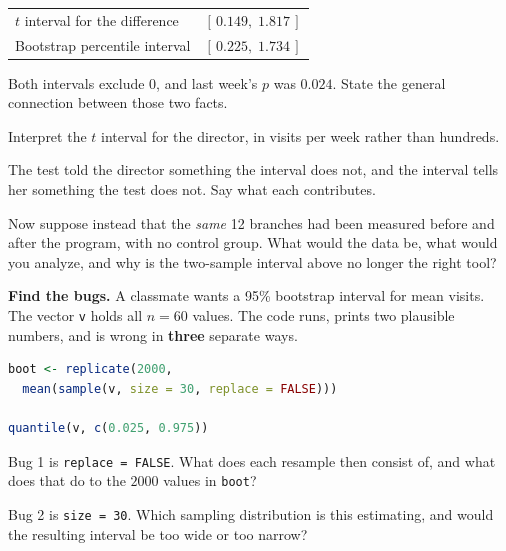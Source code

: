 \documentclass[11pt]{article}
\newcommand{\answerspace}[1]{\vspace{#1}}
\begin{document}
\begin{questions}
\begin{center}
\renewcommand{\arraystretch}{1.2}
\begin{tabular}{ll}
\toprule
$t$ interval for the difference & $[\,0.149,\; 1.817\,]$ \\
Bootstrap percentile interval & $[\,0.225,\; 1.734\,]$ \\
\bottomrule
\end{tabular}
\end{center}

\begin{parts}
\item Both intervals exclude $0$, and last week's $p$ was $0.024$. State the general connection
between those two facts.
\answerspace{3.5em}

\item Interpret the $t$ interval for the director, in visits per week rather than hundreds.
\answerspace{4em}

\item The test told the director something the interval does not, and the interval tells her
something the test does not. Say what each contributes.
\answerspace{4em}

\item Now suppose instead that the \emph{same} 12 branches had been measured before and after the
program, with no control group. What would the data be, what would you analyze, and why is the
two-sample interval above no longer the right tool?
\answerspace{4.5em}
\end{parts}

\item \textbf{Find the bugs.} A classmate wants a 95\% bootstrap interval for mean visits. The
vector \texttt{v} holds all $n = 60$ values. The code runs, prints two plausible numbers, and is
wrong in \textbf{three} separate ways.

\begin{lstlisting}[language=R]
boot <- replicate(2000,
  mean(sample(v, size = 30, replace = FALSE)))

quantile(v, c(0.025, 0.975))
\end{lstlisting}

\begin{parts}
\item Bug 1 is \texttt{replace = FALSE}. What does each resample then consist of, and what does
that do to the $2000$ values in \texttt{boot}?
\answerspace{4em}

\item Bug 2 is \texttt{size = 30}. Which sampling distribution is this estimating, and would the
resulting interval be too wide or too narrow?
\answerspace{4em}


\end{parts}
\end{questions}
\end{document}
